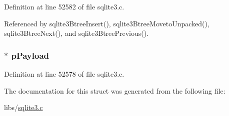 Definition at line 52582 of file sqlite3.\+c.



Referenced by sqlite3\+Btree\+Insert(), sqlite3\+Btree\+Moveto\+Unpacked(), sqlite3\+Btree\+Next(), and sqlite3\+Btree\+Previous().

\hypertarget{struct_cell_info_afb970a8132e75b04aa475245ca10bee4}{}
\subsubsection[{p\+Payload}]{$\ast$ p\+Payload}\label{struct_cell_info_afb970a8132e75b04aa475245ca10bee4}


Definition at line 52578 of file sqlite3.\+c.



The documentation for this struct was generated from the following file\+:\begin{DoxyCompactItemize}
\item 
libs/\hyperlink{sqlite3_8c}{sqlite3.\+c}\end{DoxyCompactItemize}
